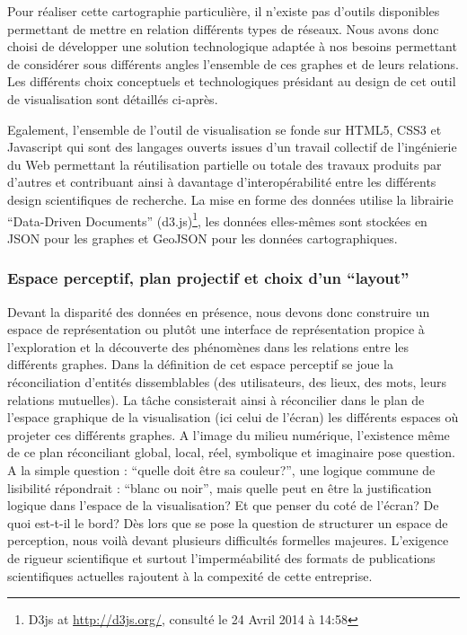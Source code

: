 Pour réaliser cette cartographie particulière, il n{\textquoteright}existe pas d{\textquoteright}outils disponibles permettant de mettre en relation différents types de réseaux. Nous avons donc choisi de développer une solution technologique adaptée à nos besoins permettant de considérer sous différents angles l{\textquoteright}ensemble de ces graphes et de leurs relations. Les différents choix conceptuels et technologiques présidant au design de cet outil de visualisation sont détaillés ci-après. 


Egalement,
l{\textquoteright}ensemble de l{\textquoteright}outil de visualisation
se fonde sur HTML5, CSS3 et Javascript qui sont des langages ouverts
issues d{\textquoteright}un travail collectif de
l{\textquoteright}ingénierie du Web permettant la réutilisation
partielle ou totale des travaux produits par d{\textquoteright}autres
et contribuant ainsi à davantage
d{\textquoteright}interopérabilité entre les différents design
scientifiques de recherche. La mise en forme des données utilise la
librairie {\textquotedblleft}Data-Driven Documents{\textquotedblright}
(d3.js)\footnote{ D3js at \url{http://d3js.org/,} consulté le 24
Avril 2014 à 14:58}, les données elles-mêmes sont stockées en
JSON pour les graphes et GeoJSON pour les données cartographiques.

\subsubsection{Espace perceptif, plan projectif et choix d{\textquoteright}un {\textquotedblleft}layout{\textquotedblright}}

Devant la disparité des données en présence, nous devons donc
construire un espace de représentation ou plut\^ot une interface de
représentation propice à l{\textquoteright}exploration et la
découverte des phénomènes dans les relations entre les
différents graphes. Dans la définition de cet espace perceptif se
joue la réconciliation d{\textquoteright}entités dissemblables (des
utilisateurs, des lieux, des mots, leurs relations mutuelles). La
t\^ache consisterait ainsi à réconcilier dans le plan de
l{\textquoteright}espace graphique de la visualisation (ici celui de
l{\textquoteright}écran) les différents espaces o\`u projeter ces
différents graphes. A l{\textquoteright}image du milieu numérique,
l{\textquoteright}existence même de ce plan réconciliant global,
local, réel, symbolique et imaginaire pose question. A la simple
question : {\textquotedblleft}quelle doit être sa
couleur?{\textquotedblright}, une logique commune de lisibilité
répondrait : {\textquotedblleft}blanc ou noir{\textquotedblright},
mais quelle peut en être la justification logique dans
l{\textquoteright}espace de la visualisation? Et que penser du coté
de l{\textquoteright}écran? De quoi est-t-il le bord? Dès lors que
se pose la question de structurer un espace de perception, nous voilà
devant plusieurs difficultés formelles majeures.
L{\textquoteright}exigence de rigueur scientifique et surtout
l{\textquoteright}imperméabilité des formats de publications
scientifiques actuelles rajoutent à la compexité de cette
entreprise.

